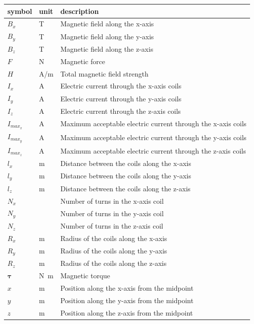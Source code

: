 \documentclass[12pt]{article}
\begin{document}
\renewcommand{\arraystretch}{1.2}
\noindent \begin{longtable*}{l l p{12cm}} \toprule
\textbf{symbol} & \textbf{unit} & \textbf{description}\\
\midrule 
$B_x$ & \si[per-mode=symbol]{\tesla} & Magnetic field along the x-axis \\
$B_y$ & \si[per-mode=symbol]{\tesla} & Magnetic field along the y-axis \\
$B_z$ & \si[per-mode=symbol]{\tesla} & Magnetic field along the z-axis \\
$F$ & \si[per-mode=symbol]{\newton} & Magnetic force \\
$H$ & \si[per-mode=symbol]{\ampere\per\metre} & Total magnetic field strength \\
$I_x$ & \si[per-mode=symbol]{\ampere} & Electric current through the x-axis coils \\
$I_y$ & \si[per-mode=symbol]{\ampere} & Electric current through the y-axis coils \\
$I_z$ & \si[per-mode=symbol]{\ampere} & Electric current through the z-axis coils \\
$I_{{max}_x}$ & \si[per-mode=symbol]{\ampere} & Maximum acceptable electric current through the x-axis coils \\
$I_{{max}_y}$ & \si[per-mode=symbol]{\ampere} & Maximum acceptable electric current through the y-axis coils \\
$I_{{max}_z}$ & \si[per-mode=symbol]{\ampere} & Maximum acceptable electric current through the z-axis coils \\
$l_x$ & \si[per-mode=symbol]{\metre} & Distance between the coils along the x-axis \\
$l_y$ & \si[per-mode=symbol]{\metre} & Distance between the coils along the y-axis \\
$l_z$ & \si[per-mode=symbol]{\metre} & Distance between the coils along the z-axis \\
$N_x$ & & Number of turns in the x-axis coil \\
$N_y$ & & Number of turns in the y-axis coil \\
$N_z$ & & Number of turns in the z-axis coil \\
$R_x$ & \si[per-mode=symbol]{\metre} & Radius of the coils along the x-axis \\
$R_y$ & \si[per-mode=symbol]{\metre} & Radius of the coils along the y-axis \\
$R_z$ & \si[per-mode=symbol]{\metre} & Radius of the coils along the z-axis \\
$\mathbf{\tau}$ & \si[per-mode=symbol]{\si{\newton\meter}} & Magnetic torque \\
$x$ & \si[per-mode=symbol]{\metre} & Position along the x-axis from the midpoint \\
$y$ & \si[per-mode=symbol]{\metre} & Position along the y-axis from the midpoint \\
$z$ & \si[per-mode=symbol]{\metre} & Position along the z-axis from the midpoint \\

\bottomrule
\end{longtable*}
\end{document}
